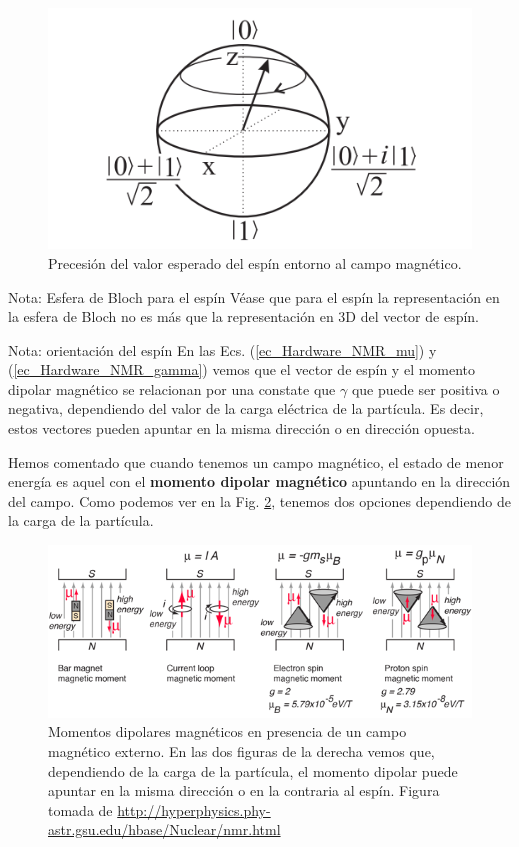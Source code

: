 \documentclass[a4paper,11pt]{book} %
\numberwithin{equation}{chapter}
\begin{document}
	\begin{figure}[H]
	\centering 
	\includegraphics[width=0.45\linewidth]{Figuras/Fig_Harware_NMR_precesion.png}
	\caption{Precesión del valor esperado del espín entorno al campo magnético.}
	\label{Fig_Harware_NMR_precesion}
	\end{figure}

	\begin{mybox_blue}{Nota: Esfera de Bloch para el espín}
	Véase que para el espín la representación en la esfera de Bloch no es más que la representación 
	en 3D del vector de espín. 	
	\end{mybox_blue}

	\begin{mybox_blue}{Nota: orientación del espín}
	En las Ecs. (\ref{ec_Hardware_NMR_mu}) y (\ref{ec_Hardware_NMR_gamma}) vemos que el vector de espín
	y el momento dipolar magnético se relacionan por una constate que $\gamma$ que puede ser positiva o 
	negativa, dependiendo del valor de la carga eléctrica de la partícula. Es decir, estos vectores pueden 
	apuntar en la misma dirección o en dirección opuesta. 

	\vspace{0.3cm}	
	Hemos comentado que cuando tenemos un campo magnético, el
	estado de menor energía es aquel con el \textbf{momento dipolar magnético} apuntando en la dirección 
	del campo. Como podemos ver en la Fig. \ref{Fig_Hardware_NMR_espines_en_B}, tenemos dos opciones 
	dependiendo de la carga de la partícula.
		\begin{figure}[H]
		\centering 
		\includegraphics[width=1\linewidth]{Figuras/Fig_Hardware_NMR_espines_en_B.png}
		\caption{Momentos dipolares magnéticos en presencia de un campo magnético externo. En las dos figuras de la derecha vemos que, dependiendo de la carga de la partícula, el momento dipolar puede apuntar en la misma dirección o en la contraria al espín. Figura tomada de \url{http://hyperphysics.phy-astr.gsu.edu/hbase/Nuclear/nmr.html}}
		\label{Fig_Hardware_NMR_espines_en_B}
		\end{figure}
	\end{mybox_blue}
\end{document}
